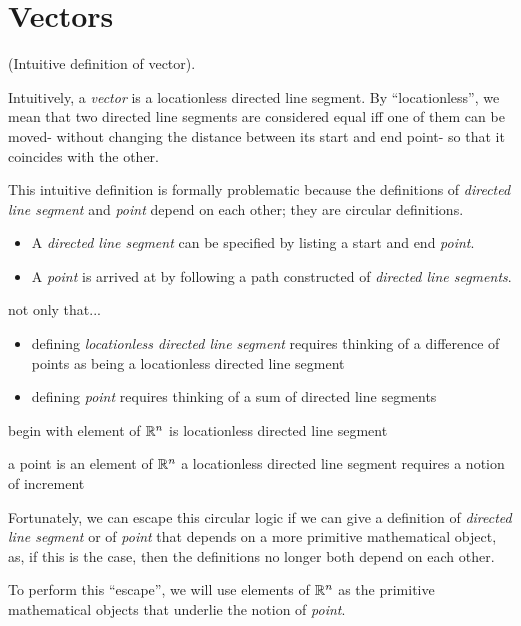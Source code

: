 \section{Vectors}

\begin{defn}
    (Intuitive definition of vector).
    
    Intuitively, a \textit{vector} is a locationless directed line segment. By ``locationless'', we mean that two directed line segments are considered equal iff one of them can be moved- without changing the distance between its start and end point- so that it coincides with the other.
    
    This intuitive definition is formally problematic because the definitions of \textit{directed line segment} and \textit{point} depend on each other; they are circular definitions.

    \begin{itemize}
        \item A \textit{directed line segment} can be specified by listing a start and end \textit{point}.
        \item A \textit{point} is arrived at by following a path constructed of \textit{directed line segments}.
    \end{itemize}
    
    not only that...
    
    \begin{itemize}
        \item defining \textit{locationless directed line segment} requires thinking of a difference of points as being a locationless directed line segment
        \item defining \textit{point} requires thinking of a sum of directed line segments 
    \end{itemize}
    
    begin with element of $\mathbb{R}^n$ is locationless directed line segment
    
    
    a point is an element of $\mathbb{R}^n$
    a locationless directed line segment requires a notion of increment
    
    
    Fortunately, we can escape this circular logic if we can give a definition of \textit{directed line segment} or of \textit{point} that depends on a more primitive mathematical object, as, if this is the case, then the definitions no longer both depend on each other.
\end{defn}

To perform this ``escape'', we will use elements of $\mathbb{R}^n$ as the primitive mathematical objects that underlie the notion of \textit{point}.


